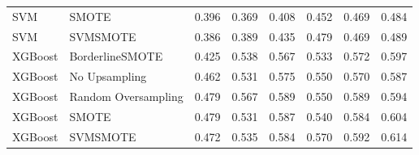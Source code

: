 \begin{tabular}{llllllll}
                            SVM &                         SMOTE & 0.396 &                     0.369 &                 0.408 &                  0.452 &                                   0.469 &    0.484 \\
                            SVM &                      SVMSMOTE & 0.386 &                     0.389 &                 0.435 &                  0.479 &                                   0.469 &    0.489 \\
                        XGBoost &               BorderlineSMOTE & 0.425 &                     0.538 &                 0.567 &                  0.533 &                                   0.572 &    0.597 \\
                        XGBoost &                 No Upsampling & 0.462 &                     0.531 &                 0.575 &                  0.550 &                                   0.570 &    0.587 \\
                        XGBoost &           Random Oversampling & 0.479 &                     0.567 &                 0.589 &                  0.550 &                                   0.589 &    0.594 \\
                        XGBoost &                         SMOTE & 0.479 &                     0.531 &                 0.587 &                  0.540 &                                   0.584 &    0.604 \\
                        XGBoost &                      SVMSMOTE & 0.472 &                     0.535 &                 0.584 &                  0.570 &                                   0.592 &    0.614 \\
\bottomrule
\end{tabular}
